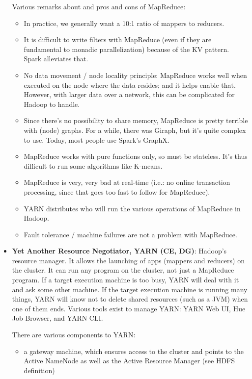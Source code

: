 \documentclass{article}
\begin{document}
\begin{itemize}
	Various remarks about and pros and cons of MapReduce:
	\begin{itemize}
		\item In practice, we generally want a 10:1 ratio of mappers to reducers.
		\item It is difficult to write filters with MapReduce (even if they are fundamental to monadic parallelization) because of the KV pattern. Spark alleviates that.
		\item No data movement / node locality principle: MapReduce works well when executed on the node where the data resides; and it helps enable that. However, with larger data over a network, this can be complicated for Hadoop to handle.
		\item Since there's no possibility to share memory, MapReduce is pretty terrible with (node) graphs. For a while, there was Giraph, but it's quite complex to use. Today, most people use Spark's GraphX.
		\item MapReduce works with pure functions only, so must be stateless. It's thus difficult to run some algorithms like K-means.
		\item MapReduce is very, very bad at real-time (i.e.: no online transaction processing, since that goes too fast to follow for MapReduce).
		\item YARN distributes who will run the various operations of MapReduce in Hadoop.
		\item Fault tolerance / machine failures are not a problem with MapReduce.
	\end{itemize}

	\item \textbf{Yet Another Resource Negotiator, YARN (CE, DG)}: Hadoop's resource manager. It allows the launching of apps (mappers and reducers) on the cluster. It can run any program on the cluster, not just a MapReduce program. If a target execution machine is too busy, YARN will deal with it and ask some other machine. If the target execution machine is running many things, YARN will know not to delete shared resources (such as a JVM) when one of them ends. Various tools exist to manage YARN: YARN Web UI, Hue Job Browser, and YARN CLI.

	There are various components to YARN:
	\begin{itemize}
		\item a gateway machine, which ensures access to the cluster and points to the Active NameNode as well as the Active Resource Manager (see HDFS definition)


\end{itemize}
\end{itemize}
\end{document}
